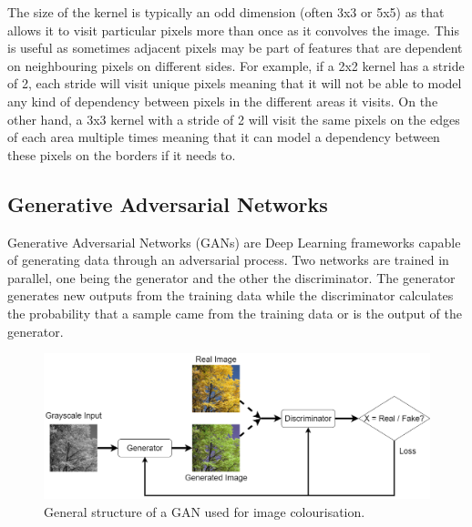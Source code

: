\documentclass{l4proj}
\begin{document}
The size of the kernel is typically an odd dimension (often 3x3 or 5x5) as that allows it to visit particular pixels more than once as it convolves the image. This is useful as sometimes adjacent pixels may be part of features that are dependent on neighbouring pixels on different sides. For example, if a 2x2 kernel has a stride of 2, each stride will visit unique pixels meaning that it will not be able to model any kind of dependency between pixels in the different areas it visits. On the other hand, a 3x3 kernel with a stride of 2 will visit the same pixels on the edges of each area multiple times meaning that it can model a dependency between these pixels on the borders if it needs to.

\subsection{Generative Adversarial Networks}
\label{gan}
Generative Adversarial Networks (GANs) are Deep Learning frameworks capable of generating data through an adversarial process. Two networks are trained in parallel, one being the generator and the other the discriminator. The generator generates new outputs from the training data while the discriminator calculates the probability that a sample came from the training data or is the output of the generator\cite{GANs}.

\begin{figure}[H]
    \centering
    \includegraphics[width=1.0\linewidth]{images/GAN.png}    

    \caption{General structure of a GAN used for image colourisation.}

    \label{fig:gan} 
\end{figure}
\end{document}
